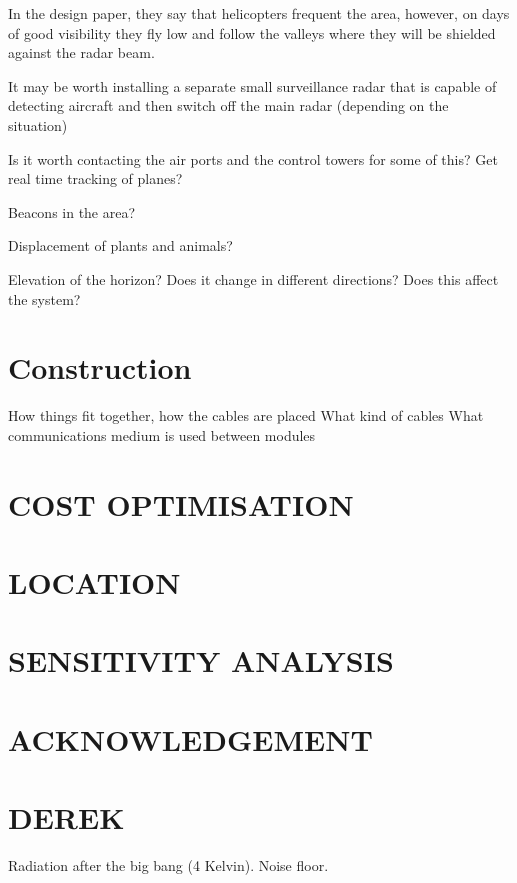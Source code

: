 \documentclass[11pt]{witseiepaper}
\begin{document}
In the design paper, they say that helicopters frequent the area, however, on days of good visibility they fly low and follow the valleys where they will be shielded against the radar beam.

It may be worth installing a separate small surveillance radar that is capable of detecting aircraft and then switch off the main radar (depending on the situation)

Is it worth contacting the air ports and the control towers for some of this? Get real time tracking of planes?

Beacons in the area?

Displacement of plants and animals?

Elevation of the horizon? Does it change in different directions? Does this affect the system?


\section{Construction} \label{sec:Construction}

How things fit together, how the cables are placed
What kind of cables
What communications medium is used between modules



\section{COST OPTIMISATION} \label{sec:COSTOPTIMISATION}

\section{LOCATION} \label{sec:LOCATION}


\section{SENSITIVITY ANALYSIS} \label{sec:SENSITIVITYANALYSIS}

\section*{ACKNOWLEDGEMENT} \label{sec:ACKNOWLEDGEMENT}


\section{DEREK}

Radiation after the big bang (4 Kelvin). 
Noise floor. 
\end{document}
